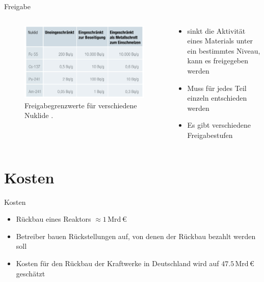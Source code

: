 \begin{frame}{Freigabe}
  \begin{columns}

    \begin{column}{0.48\textwidth}
      \begin{figure}
         \centering
         \includegraphics[width=1\textwidth]{./bilder/freigabeoption.PNG}
         \caption{Freigabegrenzwerte für verschiedene Nuklide \cite{stilllegung_grs}. }
         \label{ fig: freigabegrenzwerte}
       \end{figure}
    \end{column}

    \begin{column}{0.48\textwidth}
      \begin{itemize}
        \setlength\itemsep{1.2em}
        \item{ sinkt die Aktivität eines Materials unter ein bestimmtes Niveau, kann es freigegeben werden }
        \item{ Muss für jedes Teil einzeln entschieden werden}
        \item {Es gibt verschiedene Freigabestufen}
      \end{itemize}
    \end{column}

  \end{columns}
\end{frame}



\section{Kosten}



\begin{frame}{Kosten}
  \begin{itemize}
    \setlength\itemsep{1.2em}
    \item{ Rückbau eines Reaktors $\approx 1 \,\mathrm{Mrd} \, \euro$ } 
    \item{ Betreiber bauen Rückstellungen auf, von denen der Rückbau bezahlt werden soll}
    \item{ Kosten für den Rückbau der Kraftwerke in Deutschland wird auf  $\num{47.5} \, \mathrm{Mrd} \,\euro$ geschätzt}
  \end{itemize}
\end{frame}



